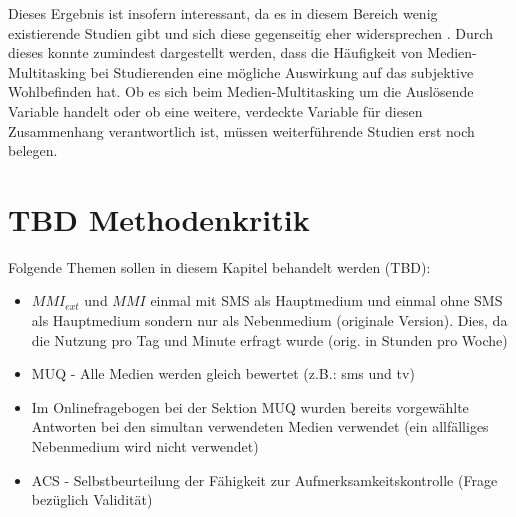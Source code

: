  Dieses Ergebnis ist insofern interessant, da es in diesem Bereich wenig existierende Studien gibt und sich diese gegenseitig eher widersprechen \cite{Pea2012, Shih2013}. Durch dieses konnte zumindest dargestellt werden, dass die Häufigkeit von Medien-Multitasking bei Studierenden eine mögliche Auswirkung auf das subjektive Wohlbefinden hat. Ob es sich beim Medien-Multitasking um die Auslösende Variable handelt oder ob eine weitere, verdeckte Variable für diesen Zusammenhang verantwortlich ist, müssen weiterführende Studien erst noch belegen. 
\section{TBD Methodenkritik}\label{section.diskussion.methodenkritik}
Folgende Themen sollen in diesem Kapitel behandelt werden (TBD):
\begin{itemize}
    \item $MMI_{ext}$ und $MMI$ einmal mit SMS als Hauptmedium und einmal ohne SMS als Hauptmedium sondern nur als Nebenmedium (originale Version). Dies, da die Nutzung pro Tag und Minute erfragt wurde (orig. in Stunden pro Woche)
    \item MUQ - Alle Medien werden gleich bewertet (z.B.: sms und tv)
    \item Im Onlinefragebogen bei der Sektion MUQ wurden bereits vorgewählte Antworten bei den simultan verwendeten Medien verwendet (ein allfälliges Nebenmedium wird nicht verwendet)
    \item ACS - Selbstbeurteilung der Fähigkeit zur Aufmerksamkeitskontrolle (Frage bezüglich Validität)
\end{itemize}


